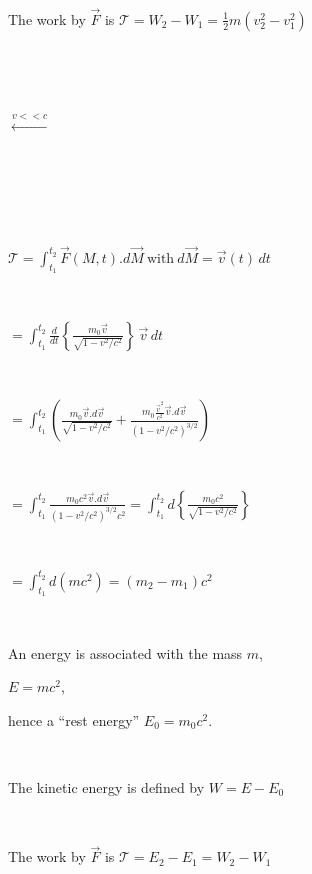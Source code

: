 \documentclass[12pt]{paper}
\newcommand{\F}{\ensuremath{\vec F}}
\newcommand{\vv}{\ensuremath{\vec v}}
\newcommand{\blue}{\color{blue}}
\begin{document}
\begin{figure}
\begin{minipage}[b]{.44\linewidth}
~


The work by $\F$ is $\mathcal{T} = W_2 -W _1 = \frac{ \textstyle{1}}{\textstyle{2}} m (v_2^2 - v_1^2)$ 

~

~


\end{minipage}
\hspace{.01\linewidth}
\begin{minipage}[b]{.04\linewidth}

\blue 

\bf \LARGE $\stackrel{v<< c}{\longleftarrow}$

~

~

\end{minipage}
\begin{minipage}[b]{.52\linewidth}
\centering
\Large

\blue 

~


$\mathcal{T} = \int_{t_1}^{t_2} \F(M,t) . d\vec M ~ \textrm{with} ~  d\vec M = \vv(t) \, dt$

~
 
$= \int_{t_1}^{t_2}  \frac{ \textstyle{d}}{\textstyle{dt}} \left\{ \frac{ \textstyle{m_0\vv}}{\textstyle{\sqrt{1-v^2/c^2}}} \right\} \, \vv \, dt$

~

$= \int_{t_1}^{t_2}  \left( \frac{ \textstyle{m_0\vv . d\vv}}{\textstyle{\sqrt{1-v^2/c^2}}} +\frac{ \textstyle{m_0 \frac{ \textstyle{\vv^2}}{\textstyle{c^2}} \vv . d\vv}}{ \textstyle{ (1-v^2/c^2)^{3/2}} } \right) $


~

$=  \int_{t_1}^{t_2} \frac{ \textstyle{m_0 c^2 \vv . d\vv}}{\textstyle{(1-v^2/c^2)^{3/2}}c^2}  =  \int_{t_1}^{t_2} d \left\{ \frac{ \textstyle{m_0 c^2}}{\textstyle{\sqrt{1-v^2/c^2}}}  \right\} $

~

$= \int_{t_1}^{t_2} d (m c^2)  = (m_2 - m_1 ) c^2$


~

An energy is associated with the mass $m$, 


$E=mc^2$, 


hence a ``rest energy'' $E_0 = m_0 c^2$. 

~

The kinetic energy is defined by $W = E - E_0$

~

The work by $\F$ is $\mathcal{T} = E_2 - E_1 = W_2 -W _1$ 

~

~


\end{minipage}

\end{figure}
\end{document}
